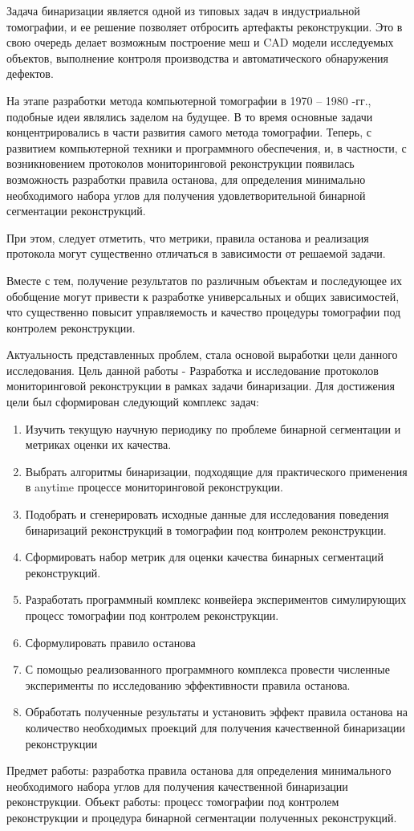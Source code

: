Задача бинаризации является одной из типовых задач в индустриальной томографии, и ее решение позволяет отбросить артефакты реконструкции. Это в свою очередь делает возможным построение меш и CAD модели исследуемых объектов, выполнение контроля производства и автоматического обнаружения дефектов.

На этапе разработки метода компьютерной томографии в 1970 – 1980 -гг., подобные идеи являлись заделом на будущее. В то время основные задачи концентрировались в части развития самого метода томографии. Теперь, с развитием компьютерной техники и программного обеспечения, и, в частности, с возникновением протоколов мониторинговой реконструкции появилась возможность разработки правила останова, для определения минимально необходимого набора углов для получения удовлетворительной бинарной сегментации реконструкций. 

При этом, следует отметить, что метрики, правила останова и реализация протокола могут существенно отличаться в зависимости от решаемой задачи. 

Вместе с тем, получение результатов по различным объектам и последующее их обобщение могут привести к разработке универсальных и общих зависимостей, что существенно повысит управляемость и качество процедуры томографии под контролем реконструкции. 

Актуальность представленных проблем, стала основой выработки цели данного исследования.
Цель данной работы - Разработка и исследование протоколов мониторинговой реконструкции в рамках задачи бинаризации.
Для достижения цели был сформирован следующий комплекс задач:
\begin{enumerate}
    \item Изучить текущую научную периодику по проблеме бинарной сегментации и метриках оценки их качества.
    \item Выбрать алгоритмы бинаризации, подходящие для практического применения в anytime процессе мониторинговой реконструкции.
    \item Подобрать и сгенерировать исходные данные для исследования поведения бинаризаций реконструкций в томографии под контролем реконструкции.
    \item Сформировать набор метрик для оценки качества бинарных сегментаций реконструкций.
    \item Разработать программный комплекс конвейера экспериментов симулирующих процесс томографии под контролем реконструкции.
    \item Сформулировать правило останова
    \item С помощью реализованного программного комплекса провести численные эксперименты по исследованию эффективности правила останова.
    \item Обработать полученные результаты и установить эффект правила останова на количество необходимых проекций для получения качественной бинаризации реконструкции
\end{enumerate}
Предмет работы: разработка правила останова для определения минимального необходимого набора углов для получения качественной бинаризации реконструкции.
Объект работы: процесс томографии под контролем реконструкции и процедура бинарной сегментации полученных реконструкций.
